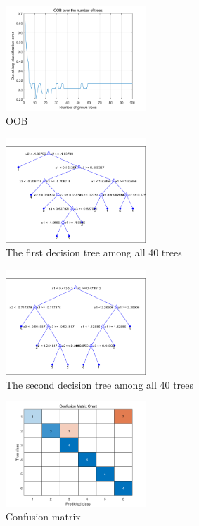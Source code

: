 \documentclass[10pt,twocolumn,letterpaper]{article}
\begin{document}
\begin{figure}[h]
\begin{center}
   \includegraphics[width=0.47\textwidth]{sec4_part2a}
\end{center}
   \caption{OOB}
\label{fig:32}
\end{figure}

\begin{figure}[h]
\begin{center}
   \includegraphics[width=0.47\textwidth]{sec4_part2b_1}
\end{center}
   \caption{The first decision tree among all 40 trees}
\label{fig:33}
\end{figure}

\begin{figure}[h]
\begin{center}
   \includegraphics[width=0.47\textwidth]{sec4_part2b_2}
\end{center}
   \caption{The second decision tree among all 40 trees}
\label{fig:34}
\end{figure}

\begin{figure}[h]
\begin{center}
   \includegraphics[width=0.47\textwidth]{sec4_part2c}
\end{center}
   \caption{Confusion matrix}
\label{fig:35}
\end{figure}
\end{document}
